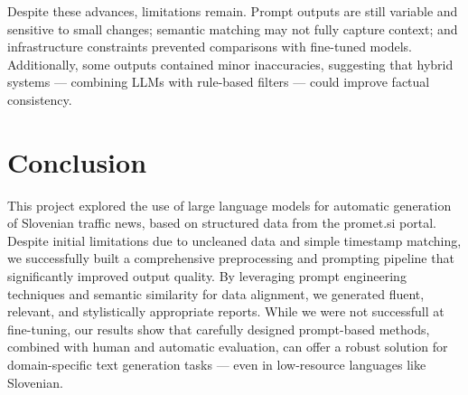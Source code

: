 \documentclass[fleqn,moreauthors,10pt]{ds_report}
\begin{document}
Despite these advances, limitations remain. Prompt outputs are still variable and sensitive to small changes; semantic matching may not fully capture context; and infrastructure constraints prevented comparisons with fine-tuned models. Additionally, some outputs contained minor inaccuracies, suggesting that hybrid systems — combining LLMs with rule-based filters — could improve factual consistency.

\section*{Conclusion}

This project explored the use of large language models for automatic generation of Slovenian traffic news, based on structured data from the promet.si portal. Despite initial limitations due to uncleaned data and simple timestamp matching, we successfully built a comprehensive preprocessing and prompting pipeline that significantly improved output quality. By leveraging prompt engineering techniques and semantic similarity for data alignment, we generated fluent, relevant, and stylistically appropriate reports. While we were not successfull at fine-tuning, our results show that carefully designed prompt-based methods, combined with human and automatic evaluation, can offer a robust solution for domain-specific text generation tasks — even in low-resource languages like Slovenian.




\end{document}
